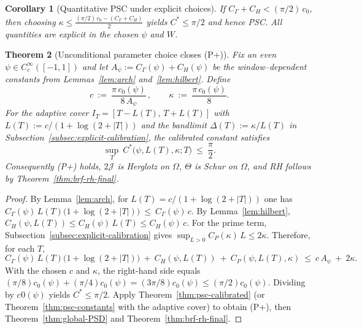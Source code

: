 \documentclass[11pt]{article}
\newtheorem{theorem}{Theorem}
\newtheorem{corollary}[theorem]{Corollary}
\theoremstyle{remark}
\begin{document}
\begin{corollary}[Quantitative PSC under explicit choices]\label{cor:psc-quant}
If $C_\Gamma+C_H < (\pi/2)\,c_0$, then choosing $\kappa\le \frac{(\pi/2)\,c_0-(C_\Gamma+C_H)}{2}$ yields $C^*\le \pi/2$ and hence PSC. All quantities are explicit in the chosen $\psi$ and $W$.
\end{corollary}

\begin{theorem}[Unconditional parameter choice closes (P+)]\label{thm:unconditional-choice}
Fix an even $\psi\in C_c^\infty([-1,1])$ and let $A_\psi:=C_\Gamma(\psi)+C_H(\psi)$ be the window–dependent constants from Lemmas~\ref{lem:arch} and~\ref{lem:hilbert}. Define
\[
 c\ :=\ \frac{\pi\,c_0(\psi)}{8\,A_\psi}\,,\qquad \kappa\ :=\ \frac{\pi\,c_0(\psi)}{8}.
\]
For the adaptive cover $I_T=[T-L(T),\,T+L(T)]$ with $L(T):=c/(1+\log(2+|T|))$ and the bandlimit $\Delta(T):=\kappa/L(T)$ in Subsection~\ref{subsec:explicit-calibration}, the calibrated constant satisfies
\[
 \sup_T\ C^*\big(\psi,L(T),\kappa;T\big)\ \le\ \frac{\pi}{2}.
\]
Consequently \emph{(P+)} holds, $2\mathcal J$ is Herglotz on $\Omega$, $\Theta$ is Schur on $\Omega$, and \textup{RH} follows by Theorem~\ref{thm:brf-rh-final}.
\end{theorem}

\begin{proof}
By Lemma~\ref{lem:arch}, for $L(T)=c/(1+\log(2+|T|))$ one has
\(
 C_\Gamma(\psi)\,L(T)\big(1+\log(2+|T|)\big)\ \le\ C_\Gamma(\psi)\,c.
\)
By Lemma~\ref{lem:hilbert}, $C_H(\psi,L(T))\le C_H(\psi)\,L(T)\le C_H(\psi)\,c$. For the prime term, Subsection~\ref{subsec:explicit-calibration} gives $\sup_{L>0} C_P(\kappa)\,L\le 2\kappa$. Therefore, for each $T$,
\[
 C_\Gamma(\psi)\,L(T)\big(1+\log(2+|T|)\big)\ +\ C_H(\psi,L(T))\ +\ C_P(\psi,L(T),\kappa)
 \ \le\ c\,A_\psi\ +\ 2\kappa.
\]
With the chosen $c$ and $\kappa$, the right-hand side equals $(\pi/8)c_0(\psi)+(\pi/4)c_0(\psi)=(3\pi/8)c_0(\psi)\le (\pi/2)c_0(\psi)$. Dividing by $c_\!0(\psi)$ yields $C^*\le \pi/2$. Apply Theorem~\ref{thm:psc-calibrated} (or Theorem~\ref{thm:psc-constants} with the adaptive cover) to obtain (P+), then Theorem~\ref{thm:global-PSD} and Theorem~\ref{thm:brf-rh-final}.
\end{proof}
\end{document}

